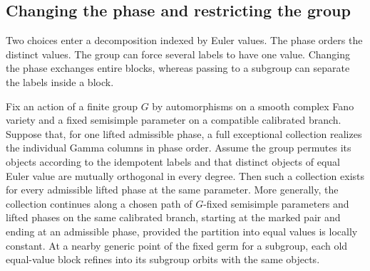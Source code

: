 \subsection{Changing the phase and restricting the group}\label{sec:blocktransport}

Two choices enter a decomposition indexed by Euler values. The phase orders the distinct values. The group can force several labels to have one value. Changing the phase exchanges entire blocks, whereas passing to a subgroup can separate the labels inside a block.

\begin{proposition}\label{prop:blocktransport}
Fix an action of a finite group $G$ by automorphisms on a smooth complex Fano variety and a fixed semisimple parameter on a compatible calibrated branch. Suppose that, for one lifted admissible phase, a full exceptional collection realizes the individual Gamma columns in phase order. Assume the group permutes its objects according to the idempotent labels and that distinct objects of equal Euler value are mutually orthogonal in every degree. Then such a collection exists for every admissible lifted phase at the same parameter. More generally, the collection continues along a chosen path of $G$-fixed semisimple parameters and lifted phases on the same calibrated branch, starting at the marked pair and ending at an admissible phase, provided the partition into equal values is locally constant. At a nearby generic point of the fixed germ for a subgroup, each old equal-value block refines into its subgroup orbits with the same objects.
\end{proposition}

